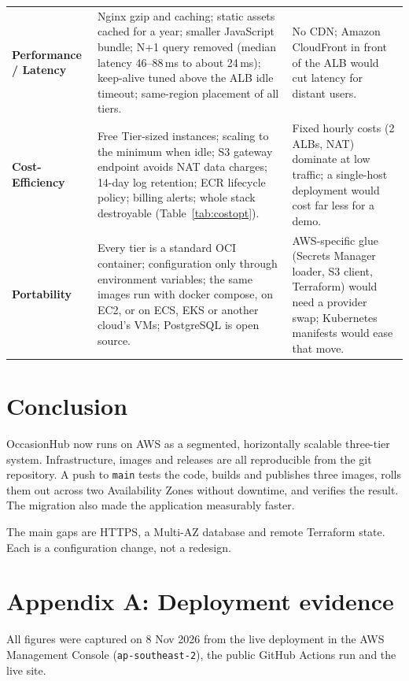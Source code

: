 \documentclass[10pt,a4paper]{article}
\begin{document}
\begin{table}[H]
\begin{tabularx}{\linewidth}{@{}>{\raggedright\arraybackslash\bfseries}p{2.55cm} L L@{}}
Performance / Latency & Nginx gzip and caching; static assets cached for a year; smaller JavaScript bundle; N+1 query removed (median latency 46--88\,ms to about 24\,ms); keep-alive tuned above the ALB idle timeout; same-region placement of all tiers. & No CDN; Amazon CloudFront in front of the ALB would cut latency for distant users. \\
Cost-Efficiency & Free Tier-sized instances; scaling to the minimum when idle; S3 gateway endpoint avoids NAT data charges; 14-day log retention; ECR lifecycle policy; billing alerts; whole stack destroyable (Table~\ref{tab:costopt}). & Fixed hourly costs (2 ALBs, NAT) dominate at low traffic; a single-host deployment would cost far less for a demo. \\
Portability & Every tier is a standard OCI container; configuration only through environment variables; the same images run with docker compose, on EC2, or on ECS, EKS or another cloud's VMs; PostgreSQL is open source. & AWS-specific glue (Secrets Manager loader, S3 client, Terraform) would need a provider swap; Kubernetes manifests would ease that move. \\
\bottomrule
\end{tabularx}
\end{table}

\section{Conclusion}
OccasionHub now runs on AWS as a segmented, horizontally scalable three-tier
system. Infrastructure, images and releases are all reproducible from the git
repository. A push to \texttt{main} tests the code, builds and publishes three
images, rolls them out across two Availability Zones without downtime, and
verifies the result. The migration also made the application measurably faster.

The main gaps are HTTPS, a Multi-AZ database and remote Terraform state. Each
is a configuration change, not a redesign.

\clearpage
\appendix
\section*{Appendix A: Deployment evidence}
All figures were captured on 8 Nov 2026 from the live deployment in the AWS
Management Console (\texttt{ap-southeast-2}), the public GitHub Actions run and
the live site.
\end{document}
